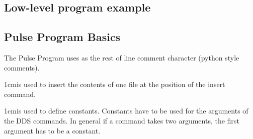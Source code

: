 \documentclass[11pt]{scrartcl}
\newcommand{\declaration}[2]{\vspace*{2ex}#1\begin{addmargin}{1cm}{#2}\end{addmargin}}
\begin{document}
\subsection{Low-level program example}

\subsection{Pulse Program Basics}
The Pulse Program uses \lit{\#} as the rest of line comment character (python style comments). 

\declaration{ }{is used to insert the contents of one file at the position of the insert command.}

\declaration{ }{is used to define constants. Constants have to be used for the \synt{channel} arguments of the DDS commands. In general if a command takes two arguments, the first argument has to be a constant.}
\end{document}
